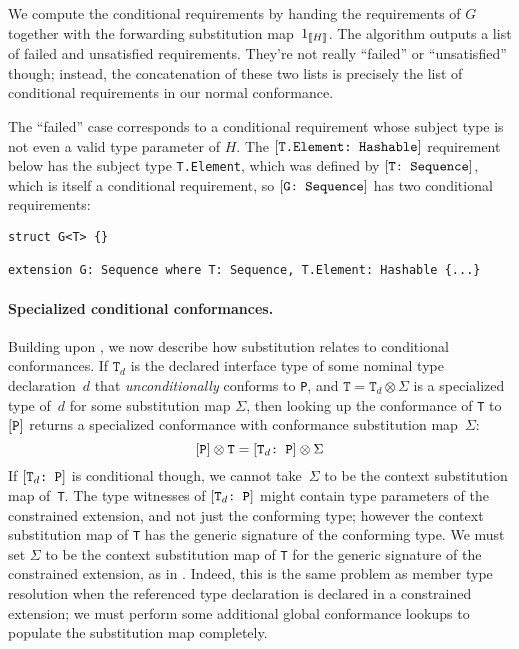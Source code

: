 \documentclass[../generics]{subfiles}
\begin{document}
We compute the conditional requirements by handing  the requirements of $G$ together with the forwarding substitution map~$1_{[\![H]\!]}$. The algorithm outputs a list of failed and unsatisfied requirements. They're not really ``failed'' or ``unsatisfied'' though; instead, the concatenation of these two lists is precisely the list of conditional requirements in our normal conformance.

The ``failed'' case corresponds to a conditional requirement whose subject type is not even a valid type parameter of $H$. The $[\texttt{T.Element:~Hashable}]$ requirement below has the subject type \texttt{T.Element}, which was defined by $[\texttt{T:~Sequence}]$, which is itself a conditional requirement, so $[\texttt{G:~Sequence}]$ has two conditional requirements:
\begin{Verbatim}
struct G<T> {}

extension G: Sequence where T: Sequence, T.Element: Hashable {...}
\end{Verbatim}
\paragraph{Specialized conditional conformances.} Building upon , we now describe how substitution relates to conditional conformances. If $\texttt{T}_d$ is the declared interface type of some nominal type declaration~$d$ that \emph{unconditionally} conforms to \texttt{P}, and $\texttt{T}=\texttt{T}_d\otimes\Sigma$ is a specialized type of~$d$ for some substitution map $\Sigma$, then looking up the conformance of \texttt{T} to $[\texttt{P}]$ returns a specialized conformance with conformance substitution map~$\Sigma$:
\[[\texttt{P}]\otimes\texttt{T}=[\texttt{$\texttt{T}_d$:~P}]\otimes\Sigma\]
If $[\texttt{$\texttt{T}_d$:~P}]$ is conditional though, we cannot take~$\Sigma$ to be the context substitution map of~\texttt{T}. The type witnesses of $[\texttt{$\texttt{T}_d$:~P}]$ might contain type parameters of the constrained extension, and not just the conforming type; however the context substitution map of \texttt{T} has the generic signature of the conforming type. We must set $\Sigma$ to be the context substitution map of \texttt{T} for the generic signature of the constrained extension, as in . Indeed, this is the same problem as member type resolution when the referenced type declaration is declared in a constrained extension; we must perform some additional global conformance lookups to populate the substitution map completely.
\end{document}
